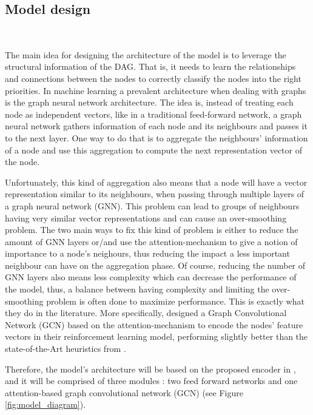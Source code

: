\subsection{Model design}
~
\label{sec:model_design}

The main idea for designing the architecture of the model is 
to leverage the structural information of the DAG.
That is, it needs to learn the relationships and connections
between the nodes to correctly classify the nodes into the right priorities.
In machine learning a prevalent architecture when dealing with graphs
is the graph neural network architecture.
The idea is, instead of treating each node as independent vectors, like 
in a traditional feed-forward network, 
a graph neural network gathers information of each node and its neighbours 
and passes it to the next layer.
One way to do that is to aggregate the neighbours' information of a node
and use this aggregation to compute the next representation vector of the node.

Unfortunately, this kind of aggregation also means that a node will have a 
vector representation similar to its neighbours, when passing through multiple layers of a graph neural network (GNN).
This problem can lead to groups of neighbours having very similar vector representations
and can cause an over-smoothing problem\cite{chen2020oversmoothing}.
The two main ways to fix this kind of problem is either to reduce the amount of GNN layers 
or/and use the attention-mechanism to give a notion of importance to a node's neighours,
thus reducing the impact a less important neighbour can have on the aggregation phase.
Of course, reducing the number of GNN layers also means less complexity which can decrease the performance of the model,
thus, a balance between having complexity and limiting the over-smoothing problem is often done to maximize performance.
This is exactly what they do in the literature\cite{Lee2021GlobalDagSchedDRL}\cite{Zhao2024GATDRLmodel}.
More specifically, \citet{Lee2021GlobalDagSchedDRL} designed a Graph Convolutional Network (GCN) based on the attention-mechanism
to encode the nodes' feature vectors in their reinforcement learning model, performing slightly better than the state-of-the-Art
heuristics from \citet{zhao2020DAGsched}.

Therefore, the model's architecture will be based on the proposed encoder in \citet{Lee2021GlobalDagSchedDRL},
and it will be comprised of three modules :
two feed forward networks and one attention-based graph convolutional network (GCN) (see Figure \ref{fig:model_diagram}).

